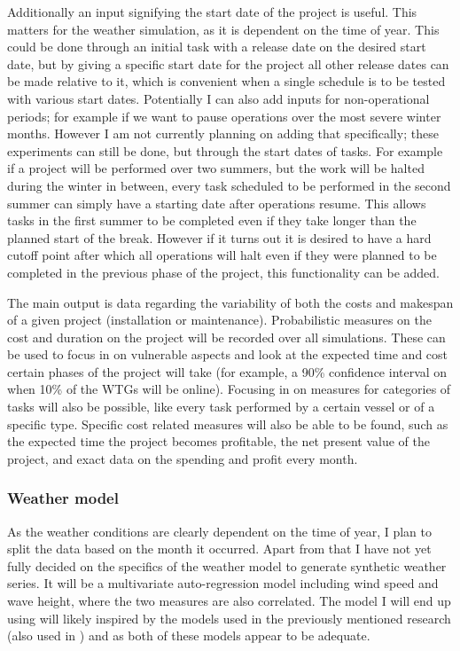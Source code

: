 \documentclass[a4paper,12pt]{article}
\begin{document}
Additionally an input signifying the start date of the project is useful. This matters for the weather simulation, as it is dependent on the time of year. This could be done through an initial task with a release date on the desired start date, but by giving a specific start date for the project all other release dates can be made relative to it, which is convenient when a single schedule is to be tested with various start dates. Potentially I can also add inputs for non-operational periods; for example if we want to pause operations over the most severe winter months. However I am not currently planning on adding that specifically; these experiments can still be done, but through the start dates of tasks. For example if a project will be performed over two summers, but the work will be halted during the winter in between, every task scheduled to be performed in the second summer can simply have a starting date after operations resume. This allows tasks in the first summer to be completed even if they take longer than the planned start of the break. However if it turns out it is desired to have a hard cutoff point after which all operations will halt even if they were planned to be completed in the previous phase of the project, this functionality can be added. 

The main output is data regarding the variability of both the costs and makespan of a given project (installation or maintenance). Probabilistic measures on the cost and duration on the project will be recorded over all simulations. These can be used to focus in on vulnerable aspects and look at the expected time and cost certain phases of the project will take (for example, a 90\% confidence interval on when 10\% of the WTGs will be online). Focusing in on measures for categories of tasks will also be possible, like every task performed by a certain vessel or of a specific type. Specific cost related measures will also be able to be found, such as the expected time the project becomes profitable, the net present value of the project, and exact data on the spending and profit every month. 

\subsubsection{Weather model} \label{sss:wemo}
As the weather conditions are clearly dependent on the time of year, I plan to split the data based on the month it occurred. Apart from that I have not yet fully decided on the specifics of the weather model to generate synthetic weather series. It will be a multivariate auto-regression model including wind speed and wave height, where the two measures are also correlated. The model I will end up using will likely inspired by the models used in the previously mentioned research \cite{dinwoodie2014operational} (also used in \cite{barlow2018mixed}) and \cite{kerkhove2017optimised} as both of these models appear to be adequate.
\end{document}
